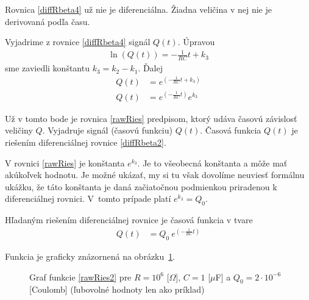 \documentclass[a4paper, 10pt, ]{article}
\begin{document}
\bigskip

Rovnica \eqref{diffRbeta4} už nie je diferenciálna. Žiadna veličina v nej nie je derivovaná podľa času.

Vyjadrime z rovnice \eqref{diffRbeta4} signál $Q(t)$. Úpravou
\begin{align}
    \ln \left(  Q(t)  \right)  =   - \frac{1}{RC} t + k_3
\end{align}
sme zaviedli konštantu $k_3 = k_2 - k_1$. Ďalej
\begin{subequations}
    \begin{align}
        Q(t)   &=  e^{\left( - \frac{1}{RC} t + k_3 \right)} \\
        Q(t)   &=  e^{\left( - \frac{1}{RC} t \right)}  e^{k_3} \label{rawRies}
    \end{align}
\end{subequations}

Už v tomto bode je rovnica \eqref{rawRies} predpisom, ktorý udáva časovú závislosť veličiny $Q$. Vyjadruje signál (časovú funkciu) $Q(t)$. Časová funkcia $Q(t)$ je riešením diferenciálnej rovnice \eqref{diffRbeta2}.

V rovnici \eqref{rawRies} je konštanta $e^{k_3}$. Je to všeobecná konštanta a môže mať akúkoľvek hodnotu. Je možné ukázať, my si tu však dovolíme neuviesť formálnu ukážku, že táto konštanta je daná začiatočnou podmienkou priradenou k diferenciálnej rovnici. V~tomto prípade platí $e^{k_3} = Q_0$.

Hľadaným riešením diferenciálnej rovnice je časová funkcia v tvare
\begin{align}
    Q(t)   &=  Q_0 \ e^{\left( - \frac{1}{RC} t \right)}   \label{rawRies2}
\end{align}


\noindent
Funkcia je graficky znázornená na obrázku~\ref{Graffunkcie}.











\begin{figure}[!t]
	\centering


	\caption{Graf funkcie \eqref{rawRies2} pre $R = 10^6$ [$\Omega$], $C = 1$ [$\mu$F] a $Q_0 = 2\cdot 10^{-6}$ [Coulomb] (ľubovolné hodnoty len ako príklad)}
	\label{Graffunkcie}
\end{figure}
\end{document}
